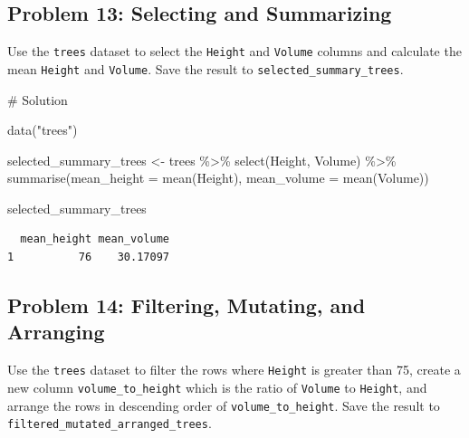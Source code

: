 \documentclass[
  letterpaper,
  DIV=11,
  numbers=noendperiod]{scrreprt}
\newenvironment{Shaded}{\begin{snugshade}}{\end{snugshade}}
\newcommand{\AttributeTok}[1]{\textcolor[rgb]{0.40,0.45,0.13}{#1}}
\newcommand{\CommentTok}[1]{\textcolor[rgb]{0.37,0.37,0.37}{#1}}
\newcommand{\FunctionTok}[1]{\textcolor[rgb]{0.28,0.35,0.67}{#1}}
\newcommand{\NormalTok}[1]{\textcolor[rgb]{0.00,0.23,0.31}{#1}}
\newcommand{\OtherTok}[1]{\textcolor[rgb]{0.00,0.23,0.31}{#1}}
\newcommand{\SpecialCharTok}[1]{\textcolor[rgb]{0.37,0.37,0.37}{#1}}
\newcommand{\StringTok}[1]{\textcolor[rgb]{0.13,0.47,0.30}{#1}}
\begin{document}
\subsection*{Problem 13: Selecting and
Summarizing}\label{problem-13-selecting-and-summarizing}

Use the \texttt{trees} dataset to select the \texttt{Height} and
\texttt{Volume} columns and calculate the mean \texttt{Height} and
\texttt{Volume}. Save the result to \texttt{selected\_summary\_trees}.

\begin{Shaded}
\begin{Highlighting}[]
\CommentTok{\# Solution}

\FunctionTok{data}\NormalTok{(}\StringTok{"trees"}\NormalTok{)}

\NormalTok{selected\_summary\_trees }\OtherTok{\textless{}{-}}\NormalTok{ trees }\SpecialCharTok{\%\textgreater{}\%}
  \FunctionTok{select}\NormalTok{(Height, Volume) }\SpecialCharTok{\%\textgreater{}\%}
  \FunctionTok{summarise}\NormalTok{(}\AttributeTok{mean\_height =} \FunctionTok{mean}\NormalTok{(Height),}
            \AttributeTok{mean\_volume =} \FunctionTok{mean}\NormalTok{(Volume))}

\NormalTok{selected\_summary\_trees}
\end{Highlighting}
\end{Shaded}

\begin{verbatim}
  mean_height mean_volume
1          76    30.17097
\end{verbatim}

\subsection*{Problem 14: Filtering, Mutating, and
Arranging}\label{problem-14-filtering-mutating-and-arranging}

Use the \texttt{trees} dataset to filter the rows where \texttt{Height}
is greater than 75, create a new column \texttt{volume\_to\_height}
which is the ratio of \texttt{Volume} to \texttt{Height}, and arrange
the rows in descending order of \texttt{volume\_to\_height}. Save the
result to \texttt{filtered\_mutated\_arranged\_trees}.
\end{document}

